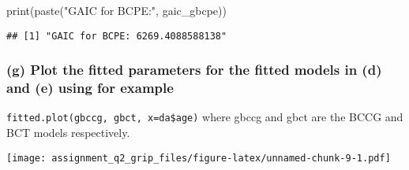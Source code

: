 \documentclass[
]{article}
\newenvironment{Shaded}{\begin{snugshade}}{\end{snugshade}}
\newcommand{\AttributeTok}[1]{\textcolor[rgb]{0.77,0.63,0.00}{#1}}
\newcommand{\CommentTok}[1]{\textcolor[rgb]{0.56,0.35,0.01}{\textit{#1}}}
\newcommand{\DecValTok}[1]{\textcolor[rgb]{0.00,0.00,0.81}{#1}}
\newcommand{\FunctionTok}[1]{\textcolor[rgb]{0.00,0.00,0.00}{#1}}
\newcommand{\NormalTok}[1]{#1}
\newcommand{\OtherTok}[1]{\textcolor[rgb]{0.56,0.35,0.01}{#1}}
\newcommand{\SpecialCharTok}[1]{\textcolor[rgb]{0.00,0.00,0.00}{#1}}
\newcommand{\StringTok}[1]{\textcolor[rgb]{0.31,0.60,0.02}{#1}}
\begin{document}
\begin{Shaded}
\begin{Highlighting}[]
\FunctionTok{print}\NormalTok{(}\FunctionTok{paste}\NormalTok{(}\StringTok{"GAIC for BCPE:"}\NormalTok{, gaic\_gbcpe))}
\end{Highlighting}
\end{Shaded}

\begin{verbatim}
## [1] "GAIC for BCPE: 6269.4088588138"
\end{verbatim}

\hypertarget{g-plot-the-fitted-parameters-for-the-fitted-models-in-d-and-e-using-for-example}{%
\subsubsection{(g) Plot the fitted parameters for the fitted models in
(d) and (e) using for
example}\label{g-plot-the-fitted-parameters-for-the-fitted-models-in-d-and-e-using-for-example}}

\texttt{fitted.plot(gbccg,\ gbct,\ x=da\$age)} where gbccg and gbct are
the BCCG and BCT models respectively.

\begin{Shaded}
\end{Shaded}

\texttt{[image: assignment\_q2\_grip\_files/figure-latex/unnamed-chunk-9-1.pdf]}

\begin{Shaded}
\end{Shaded}
\end{document}
